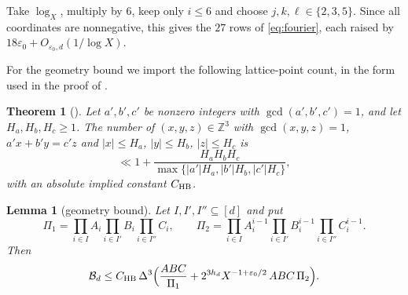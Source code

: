 \documentclass{amsart}
\newtheorem{theoremA}{Theorem}
\newtheorem{lemma}{Lemma}[section]
\theoremstyle{definition}
\theoremstyle{plain}
\numberwithin{equation}{section}
\numberwithin{table}{section}
\newcommand{\Z}{\mathbb{Z}}
\begin{document}
Take $\log_X$, multiply by $6$, keep only $i\le6$ and choose
$j,k,\ell\in\{2,3,5\}$. Since all coordinates are nonnegative, this gives
the $27$ rows of \eqref{eq:fourier}, each raised by
$18\varepsilon_0+O_{\varepsilon_0,d}(1/\log X)$.

For the geometry bound we import the following lattice-point count, in the
form used in the proof of \cite[Proposition~4.1]{BBLT}.

\begin{theoremA}[{\cite[Lemma~3]{HB}}]\label{thm:app:HB}
Let $a',b',c'$ be nonzero integers with $\gcd(a',b',c')=1$, and let
$H_a,H_b,H_c\ge1$. The number of
$(x,y,z)\in\Z^3$ with $\gcd(x,y,z)=1$, $a'x+b'y=c'z$ and $|x|\le H_a$,
$|y|\le H_b$, $|z|\le H_c$ is
\[
 \ll1+\frac{H_aH_bH_c}{\max\{|a'|H_a,|b'|H_b,|c'|H_c\}},
\]
with an absolute implied constant $C_{\rm HB}$.
\end{theoremA}

\begin{lemma}[geometry bound]\label{lem:app:geom}
Let $I,I',I''\subseteq[d]$ and put
\[
 \Pi_1=\prod_{i\in I}A_i\prod_{i\in I'}B_i\prod_{i\in I''}C_i,\qquad
 \Pi_2=\prod_{i\in I}A_i^{i-1}\prod_{i\in I'}B_i^{i-1}\prod_{i\in I''}C_i^{i-1}.
\]
Then
\[
 \mathcal B_d\le C_{\rm HB}\,\Delta^3\Bigl(\frac{ABC}{\Pi_1}
 +2^{3h_d}X^{-1+\varepsilon_0/2}\,ABC\,\Pi_2\Bigr).
\]
\end{lemma}
\end{document}
